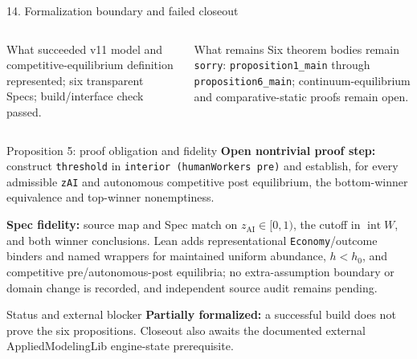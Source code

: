 \documentclass[aspectratio=169,11pt]{beamer}
\newcommand{\zAI}{z_{\mathrm{AI}}}
\begin{document}
\begin{frame}{14. Formalization boundary and failed closeout}
  \begin{columns}[T,onlytextwidth]
      \begin{block}{What succeeded}
        \scriptsize v11 model and competitive-equilibrium definition represented;
        six transparent Specs; build/interface check passed.
      \end{block}
      \begin{block}{What remains}
        \scriptsize Six theorem bodies remain \texttt{sorry}:
        \texttt{proposition1\_main} through \texttt{proposition6\_main};
        continuum-equilibrium and comparative-static proofs remain open.
      \end{block}
  \end{columns}

  \begin{block}{Proposition 5: proof obligation and fidelity}
    \scriptsize
    \textbf{Open nontrivial proof step:} construct \texttt{threshold} in
    \texttt{interior (humanWorkers pre)} and establish, for every admissible
    \texttt{zAI} and autonomous competitive post equilibrium, the bottom-winner
    equivalence and top-winner nonemptiness.\par

    \textbf{Spec fidelity:} source map and Spec match on $\zAI\in[0,1)$, the
    cutoff in $\operatorname{int}W$, and both winner conclusions. Lean adds
    representational \texttt{Economy}/outcome binders and named wrappers for
    maintained uniform abundance, $h<h_0$, and competitive pre/autonomous-post
    equilibria; no extra-assumption boundary or domain change is recorded, and
    independent source audit remains pending.
  \end{block}

  \begin{alertblock}{Status and external blocker}
    \scriptsize \textbf{Partially formalized:} a successful build does not prove
    the six propositions. Closeout also awaits the documented external
    AppliedModelingLib engine-state prerequisite.
  \end{alertblock}
\end{frame}
\end{document}
